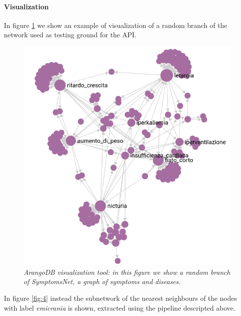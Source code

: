\documentclass[11pt,twocolumn]{article}
\begin{document}
\paragraph{Visualization}
In figure \ref{fig:3} we show an example of visualization of a random branch of the network used as testing ground for the API.

\begin{figure}[ht!]
   \includegraphics[width=\linewidth]{images/Sym_Net_crop.png}
   \caption{\small{\textit{ArangoDB visualization tool: in this figure we show a random branch of SymptomsNet, a graph of symptoms and diseases.}}}
   \label{fig:3}
\end{figure}

In figure \ref{fig:4} instead the subnetwork of the nearest neighbours of the nodes with label \textit{emicrania} is shown, extracted using the pipeline descripted above.
\end{document}
